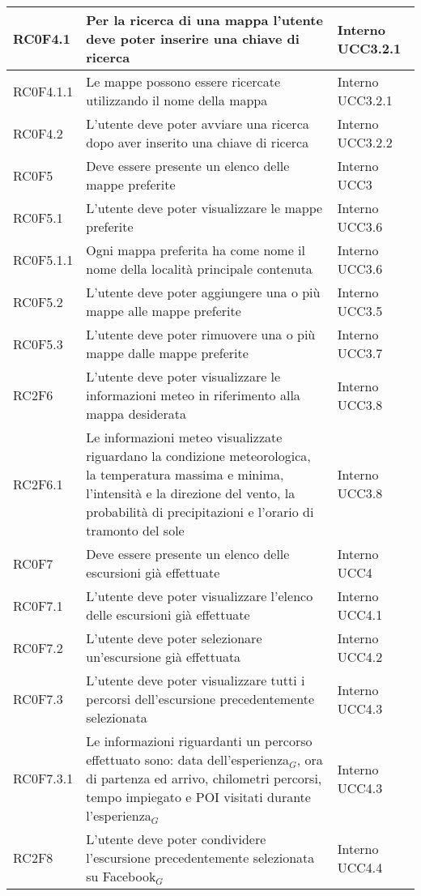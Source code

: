 \begin{center}
\begin{longtable}{|l|p{7cm}|p{1.7cm}|}
RC0F4.1		& Per la ricerca di una mappa l'utente deve poter inserire una chiave di ricerca & Interno UCC3.2.1 \\\hline
RC0F4.1.1	& Le mappe possono essere ricercate utilizzando il nome della mappa & Interno UCC3.2.1 \\\hline
RC0F4.2		& L'utente deve poter avviare una ricerca dopo aver inserito una chiave di ricerca & Interno UCC3.2.2 \\\hline
RC0F5 		& Deve essere presente un elenco delle mappe preferite & Interno UCC3 \\\hline
RC0F5.1 	& L'utente deve poter visualizzare le mappe preferite & Interno UCC3.6 \\\hline
RC0F5.1.1	& Ogni mappa preferita ha come nome il nome della località principale contenuta & Interno UCC3.6 \\\hline
RC0F5.2 	& L'utente deve poter aggiungere una o più mappe alle mappe preferite & Interno UCC3.5 \\\hline
RC0F5.3		& L'utente deve poter rimuovere una o più mappe dalle mappe preferite & Interno UCC3.7 \\\hline
RC2F6 		& L'utente deve poter visualizzare le informazioni meteo in riferimento alla mappa desiderata & Interno UCC3.8 \\\hline
RC2F6.1		& Le informazioni meteo visualizzate riguardano la condizione meteorologica, la temperatura massima e minima, l'intensità e la direzione del vento, la probabilità di precipitazioni e l'orario di tramonto del sole & Interno UCC3.8 \\\hline
RC0F7 		& Deve essere presente un elenco delle escursioni già effettuate & Interno UCC4 \\\hline
RC0F7.1		& L'utente deve poter visualizzare l'elenco delle escursioni già effettuate & Interno UCC4.1 \\\hline
RC0F7.2		& L'utente deve poter selezionare un'escursione già effettuata & Interno UCC4.2 \\\hline
RC0F7.3		& L'utente deve poter visualizzare tutti i percorsi dell'escursione precedentemente selezionata & Interno UCC4.3 \\\hline
RC0F7.3.1	& Le informazioni riguardanti un percorso effettuato sono: data dell'esperienza$_{G}$, ora di partenza ed arrivo, chilometri percorsi, tempo impiegato e POI visitati durante l'esperienza$_{G}$ & Interno UCC4.3 \\\hline
RC2F8		& L'utente deve poter condividere l'escursione precedentemente selezionata su Facebook$_{G}$ & Interno UCC4.4 \\\hline

\end{longtable}
\end{center}
